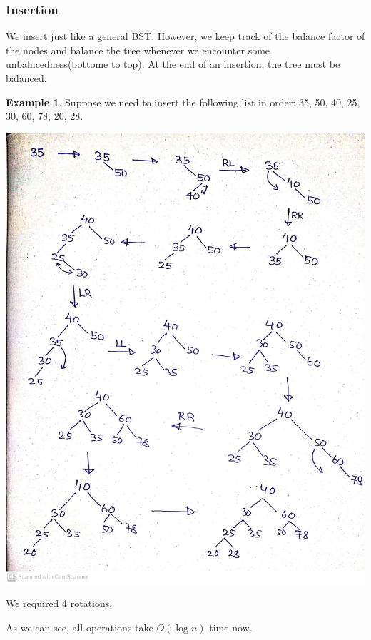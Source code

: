 \documentclass[10pt, a4paper]{extarticle}
\theoremstyle{definition}
\newtheorem{eg}{Example}
\begin{document}
\subsubsection{Insertion}
We insert just like a general BST. However, we keep track of the balance factor of the nodes and balance the tree whenever we encounter some unbalncedness(bottome to top). At the end of an insertion, the tree must be balanced.
\begin{eg}
	Suppose we need to insert the following list in order: 35, 50, 40, 25, 30, 60, 78, 20, 28.
	\begin{center}
		\includegraphics[scale=0.15]{avl-insertion.jpg}\\
	\end{center}
	We required 4 rotations.
\end{eg}

As we can see, all operations take $O(\log n)$ time now.
\end{document}
